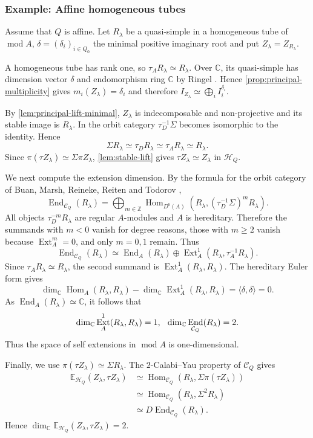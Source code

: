 \documentclass[11pt,reqno]{article}
\numberwithin{equation}{section}
\theoremstyle{definition}
\DeclareMathOperator{\End}{End}
\DeclareMathOperator{\Hom}{Hom}
\DeclareMathOperator{\Ext}{Ext}
\DeclareMathOperator{\modu}{mod}
\newcommand{\E}{\mathbb E}
\newcommand{\kk}{\mathbb C}
\begin{document}
\subsubsection{Example: Affine homogeneous tubes}
Assume that $Q$ is affine.  Let $R_\lambda$ be a quasi-simple in a homogeneous tube of $\modu A$, $\delta=(\delta_i)_{i\in Q_0}$  the minimal positive imaginary root and put $Z_\lambda=Z_{R_\lambda}$.

A homogeneous tube has rank one, so $\tau_A R_\lambda\simeq R_\lambda$. Over $\kk$, its quasi-simple has dimension vector $\delta$ and endomorphism ring $\kk$ by Ringel \cite{RingelTame}.  Hence \cref{prop:principal-multiplicity} gives $m_i(Z_\lambda)=\delta_i$ and therefore $I_{Z_\lambda}\simeq\bigoplus_iI_i^{\delta_i}$.

By \cref{lem:principal-lift-minimal}, $Z_\lambda$ is indecomposable and non-projective and its stable image is $R_\lambda$.  In the orbit category $\tau_D^{-1}\Sigma$ becomes isomorphic to the identity.  Hence
\[
 \Sigma R_\lambda\simeq \tau_D R_\lambda
 \simeq \tau_A R_\lambda\simeq R_\lambda.
\]
Since $\pi(\tau Z_\lambda)\simeq\Sigma\pi Z_\lambda$, \cref{lem:stable-lift} gives $\tau Z_\lambda\simeq Z_\lambda$ in $\mathcal H_Q$.

We next compute the extension dimension.  By the formula for the orbit category of Buan, Marsh, Reineke, Reiten and Todorov \cite{BMRRT},
\[
 \End_{\mathcal C_Q}(R_\lambda)
 =\bigoplus_{m\in\mathbb Z}
 \Hom_{D^b(A)}\!\left(R_\lambda,
 (\tau_D^{-1}\Sigma)^mR_\lambda\right).
\]
All objects $\tau_D^{-m}R_\lambda$ are regular $A$-modules and $A$ is hereditary.  Therefore the summands with $m<0$ vanish for degree reasons, those with $m\ge2$ vanish because $\Ext_A^m=0$, and only $m=0,1$ remain.  Thus
\[
 \End_{\mathcal C_Q}(R_\lambda)
 \simeq \End_A(R_\lambda)
 \oplus\Ext_A^1(R_\lambda,\tau_A^{-1}R_\lambda).
\]
Since $\tau_A R_\lambda\simeq R_\lambda$, the second summand is $\Ext_A^1(R_\lambda,R_\lambda)$.  The hereditary Euler form gives
\[
 \dim_{\kk}\Hom_A(R_\lambda,R_\lambda)
 -\dim_{\kk}\Ext_A^1(R_\lambda,R_\lambda)
 =\langle\delta,\delta\rangle=0.
\]
As $\End_A(R_\lambda)\simeq\kk$, it follows that
\[
 \dim_{\kk}\Ext_A^1(R_\lambda,R_\lambda)=1,
 \hspace{2.5mm}
 \dim_{\kk}\End_{\mathcal C_Q}(R_\lambda)=2.
\]
Thus the space of self extensions in $\modu A$ is one-dimensional.

Finally, we use $\pi(\tau Z_\lambda)\simeq\Sigma R_\lambda$.  The $2$-Calabi--Yau property of $\mathcal C_Q$ gives
\[
\begin{aligned}
 \E_{\mathcal H_Q}(Z_\lambda,\tau Z_\lambda)
 &\simeq\Hom_{\mathcal C_Q}
      (R_\lambda,\Sigma\pi(\tau Z_\lambda))\\
 &\simeq\Hom_{\mathcal C_Q}(R_\lambda,\Sigma^2R_\lambda)\\
 &\simeq D\End_{\mathcal C_Q}(R_\lambda).
\end{aligned}
\]
Hence $\dim_{\kk}\E_{\mathcal H_Q}(Z_\lambda,\tau Z_\lambda)=2$.
\end{document}
